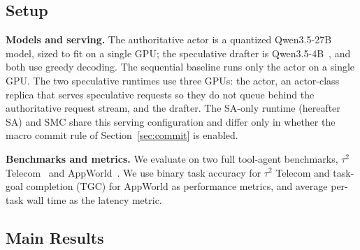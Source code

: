\subsection{Setup}
\label{sec:setup}
 
\textbf{Models and serving.}
The authoritative actor is a quantized Qwen3.5-27B model, sized to fit on a single GPU; the speculative drafter is Qwen3.5-4B~\citep{qwen3.5}, and both use greedy decoding. 
The sequential baseline runs only the actor on a single GPU. 
The two speculative runtimes use three GPUs: the actor, an actor-class replica that serves speculative requests so they do not queue behind the authoritative request stream, and the drafter. The SA-only runtime (hereafter SA) and SMC share this serving configuration and differ only in whether the macro commit rule of Section~\ref{sec:commit} is enabled.
 
\textbf{Benchmarks and metrics.}
We evaluate on two full tool-agent benchmarks, $\tau^2$ Telecom~\citep{taubench-2024} and AppWorld~\citep{appworld-2024}.
We use binary task accuracy for $\tau^2$ Telecom and task-goal completion (TGC) for AppWorld as performance metrics, and average per-task wall time as the latency metric.

\subsection{Main Results}



